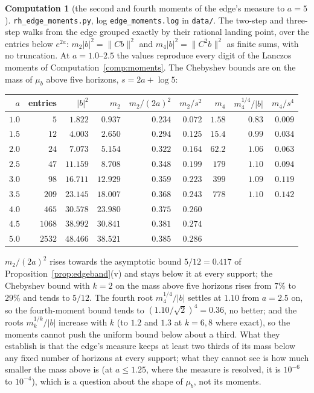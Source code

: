 \documentclass[11pt]{article}
\theoremstyle{definition}
\newtheorem{computation}[theorem]{Computation}
\theoremstyle{remark}
\begin{document}
\begin{computation}[the second and fourth moments of the edge's measure to $a=5$]\label{comp:edgemoments}
\sloppy \texttt{rh\_edge\_moments.py}, log \texttt{edge\_moments.log} in \texttt{data/}. The two-step and three-step walks from the edge grouped exactly by their rational landing point, over the entries below $e^{2a}$: $m_2|b|^2=\|Cb\|^2$ and $m_4|b|^2=\|C^2b\|^2$ as finite sums, with no truncation. At $a=1.0$--$2.5$ the values reproduce every digit of the Lanczos moments of Computation~\ref{comp:moments}. The Chebyshev bounds are on the mass of $\mu_b$ above five horizons, $s=2a+\log5$:
\begin{center}\small
\begin{tabular}{@{}rrrrrrrrr@{}}
\toprule
$a$ & entries & $|b|^2$ & $m_2$ & $m_2/(2a)^2$ & $m_2/s^2$ & $m_4$ & $m_4^{1/4}/|b|$ & $m_4/s^4$\\
\midrule
$1.0$ & $5$ & $1.822$ & $0.937$ & $0.234$ & $0.072$ & $1.58$ & $0.83$ & $0.009$\\
$1.5$ & $12$ & $4.003$ & $2.650$ & $0.294$ & $0.125$ & $15.4$ & $0.99$ & $0.034$\\
$2.0$ & $24$ & $7.073$ & $5.154$ & $0.322$ & $0.164$ & $62.2$ & $1.06$ & $0.063$\\
$2.5$ & $47$ & $11.159$ & $8.708$ & $0.348$ & $0.199$ & $179$ & $1.10$ & $0.094$\\
$3.0$ & $98$ & $16.711$ & $12.929$ & $0.359$ & $0.223$ & $399$ & $1.09$ & $0.119$\\
$3.5$ & $209$ & $23.145$ & $18.007$ & $0.368$ & $0.243$ & $778$ & $1.10$ & $0.142$\\
$4.0$ & $465$ & $30.578$ & $23.980$ & $0.375$ & $0.260$ & & &\\
$4.5$ & $1068$ & $38.992$ & $30.841$ & $0.381$ & $0.274$ & & &\\
$5.0$ & $2532$ & $48.466$ & $38.521$ & $0.385$ & $0.286$ & & &\\
\bottomrule
\end{tabular}
\end{center}
\noindent $m_2/(2a)^2$ rises towards the asymptotic bound $5/12=0.417$ of Proposition~\ref{prop:edgeband}(v) and stays below it at every support; the Chebyshev bound with $k=2$ on the mass above five horizons rises from $7\%$ to $29\%$ and tends to $5/12$. The fourth root $m_4^{1/4}/|b|$ settles at $1.10$ from $a=2.5$ on, so the fourth-moment bound tends to $(1.10/\sqrt2)^4=0.36$, no better; and the roots $m_k^{1/k}/|b|$ increase with $k$ (to $1.2$ and $1.3$ at $k=6,8$ where exact), so the moments cannot push the uniform bound below about a third. What they establish is that the edge's measure keeps at least two thirds of its mass below any fixed number of horizons at every support; what they cannot see is how much smaller the mass above is (at $a\le1.25$, where the measure is resolved, it is $10^{-6}$ to $10^{-4}$), which is a question about the shape of $\mu_b$, not its moments.
\end{computation}
\end{document}
